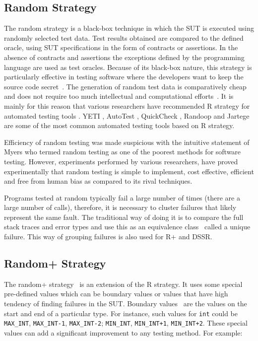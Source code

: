\subsection{Random Strategy}
The random strategy is a black-box technique in which the SUT is executed using randomly selected test data. Test results obtained are compared to the defined oracle, using SUT specifications in the form of contracts or assertions. In the absence of contracts and assertions the exceptions defined by the programming language are used as test oracles. Because of its black-box nature, this strategy is particularly effective in testing software where the developers want to keep the source code secret~\cite{chen2010adaptive}. The generation of random test data is comparatively cheap and does not require too much intellectual and computational efforts~\cite{ciupa2008finding, ciupa2011number}. It is mainly for this reason that various researchers have recommended R strategy for automated testing tools \cite{ciupa2008artoo}.
 YETI \cite{oriol2010yeti}, AutoTest \cite{leitner2007reconciling, ciupa2007experimental}, QuickCheck \cite{claessen2011quickcheck}, Randoop \cite{pacheco2007feedback} and Jartege \cite{oriat2005jartege} are some of the most common automated testing tools based on R strategy.

\indent Efficiency of random testing was made suspicious with the intuitive statement of Myers \cite{myers2011art} who termed random testing as one of the poorest methods for software testing. However, experiments performed by various researchers, \cite{ciupa2007experimental, hamlet1994random, duran1981report, duran1984evaluation, ntafos2001comparisons} have proved experimentally that random testing is simple to implement, cost effective, efficient and free from human bias as compared to its rival techniques.

Programs tested at random typically fail a large number of times (there are a large number of calls), therefore, it is necessary to cluster failures that likely represent the same fault. The traditional way of doing it is to compare the full stack traces and error types and use this as an equivalence class~\cite{ciupa2007experimental, oriol2012random} called a unique failure. This way of grouping failures is also used for R+ and DSSR.

\subsection{Random+ Strategy}
The random+ strategy~\cite{leitner2007reconciling} is an extension of the R strategy. It uses some special pre-defined values which can be boundary values or values that have high tendency of finding failures in the SUT. Boundary values~\cite{beizer2003software} are the values on the start and end of a particular type. For instance, such values for \verb+int+ could be \verb+MAX_INT+, \verb+MAX_INT-1+, \verb+MAX_INT-2+; \verb+MIN_INT+, \verb-MIN_INT+1-, \verb-MIN_INT+2-. These special values can add a significant improvement to any testing method. For example:

